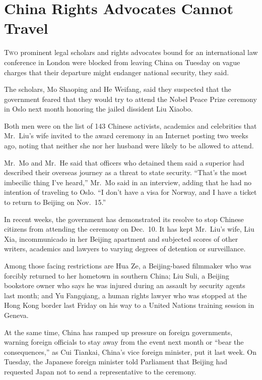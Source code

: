 ﻿\documentclass[12pt]{article}
\begin{document}
\section{China Rights Advocates Cannot Travel}

\lettrine{T}{wo} prominent legal scholars and rights advocates bound for an
international law conference in London were blocked from leaving China on Tuesday on vague charges
that their departure might endanger national security, they said.

The scholars, Mo Shaoping and He Weifang, said they suspected that the government feared that they
would try to attend the Nobel Peace Prize ceremony in Oslo next month honoring the jailed dissident
Liu Xiaobo.

Both men were on the list of 143 Chinese activists, academics and celebrities that Mr.~Liu's wife
invited to the award ceremony in an Internet posting two weeks ago, noting that neither she nor her
husband were likely to be allowed to attend.

Mr.~Mo and Mr.~He said that officers who detained them said a superior had described their overseas
journey as a threat to state security. ``That's the most imbecilic thing I've heard,'' Mr.~Mo said
in an interview, adding that he had no intention of traveling to Oslo. ``I don't have a visa for
Norway, and I have a ticket to return to Beijing on Nov.~15.''

In recent weeks, the government has demonstrated its resolve to stop Chinese citizens from attending
the ceremony on Dec.~10. It has kept Mr.~Liu's wife, Liu Xia, incommunicado in her Beijing apartment
and subjected scores of other writers, academics and lawyers to varying degrees of detention or
surveillance.

Among those facing restrictions are Hua Ze, a Beijing-based filmmaker who was forcibly returned to
her hometown in southern China; Liu Suli, a Beijing bookstore owner who says he was injured during
an assault by security agents last month; and Yu Fangqiang, a human rights lawyer who was stopped at
the Hong Kong border last Friday on his way to a United Nations training session in Geneva.

At the same time, China has ramped up pressure on foreign governments, warning foreign officials to
stay away from the event next month or ``bear the consequences,'' as Cui Tiankai, China's vice
foreign minister, put it last week. On Tuesday, the Japanese foreign minister told Parliament that
Beijing had requested Japan not to send a representative to the ceremony.
\end{document}
